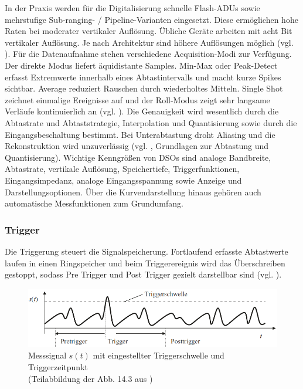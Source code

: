 \documentclass[a4paper, portrait, 12pt]{scrartcl} %
\begin{document}
In der Praxis werden für die Digitalisierung schnelle Flash-ADUs sowie mehrstufige Sub-ranging- / Pipeline‑Varianten eingesetzt. Diese ermöglichen hohe Raten bei moderater vertikaler Auflösung. Übliche Geräte arbeiten mit acht Bit vertikaler Auflösung. Je nach Architektur sind höhere Auflösungen möglich (vgl. \cite[S. 114-119]{Bernstein2023}). Für die Datenaufnahme stehen verschiedene Acquisition-Modi zur Verfügung. Der direkte Modus liefert äquidistante Samples. Min-Max oder Peak-Detect erfasst Extremwerte innerhalb eines Abtastintervalls und macht kurze Spikes sichtbar. Average reduziert Rauschen durch wiederholtes Mitteln. Single Shot zeichnet einmalige Ereignisse auf und der Roll-Modus zeigt sehr langsame Verläufe kontinuierlich an (vgl. \cite[S. 220f]{Muehl2020}). Die Genauigkeit wird wesentlich durch die Abtastrate und Abtaststrategie, Interpolation und Quantisierung sowie durch die Eingangsbeschaltung bestimmt. Bei Unterabtastung droht Aliasing und die Rekonstruktion wird unzuverlässig (vgl. \cite[S. ??]{Muehl2020}, Grundlagen zur Abtastung und Quantisierung). Wichtige Kenngrößen von DSOs sind analoge Bandbreite, Abtastrate, vertikale Auflösung, Speichertiefe, Triggerfunktionen, Eingangsimpedanz, analoge Eingangsspannung sowie Anzeige und Darstellungsoptionen. Über die Kurvendarstellung hinaus gehören auch automatische Messfunktionen zum Grundumfang.

\subsubsection{Trigger}

Die Triggerung steuert die Signalspeicherung. Fortlaufend erfasste Abtastwerte laufen in einen Ringspeicher und beim Triggerereignis wird das Überschreiben gestoppt, sodass Pre Trigger und Post Trigger gezielt darstellbar sind (vgl. \cite[S. 216f]{Muehl2020}).

\begin{figure}[H]
	\centering
		\includegraphics[scale=0.5]{trigger_oscilloscope_muehl.png} 
		\caption{\centering Messsignal $s(t)$ mit eingestellter Triggerschwelle und Triggerzeitpunkt\\(Teilabbildung der Abb. 14.3 aus \cite[S. 217]{Muehl2020})}
	\label{fig:trigger_oscilloscope}
\end{figure}
\end{document}

